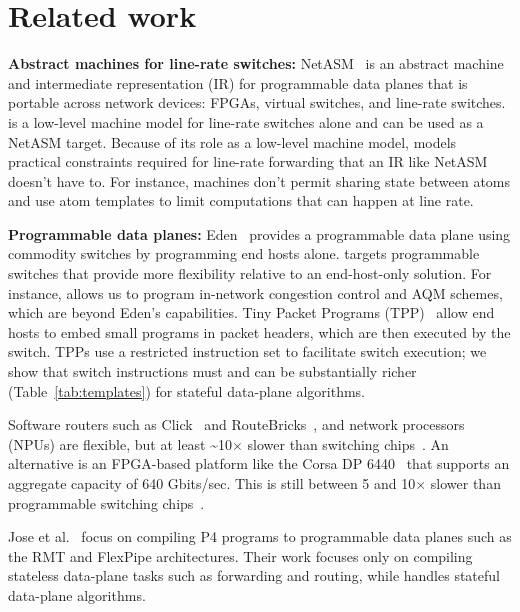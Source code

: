 \section{Related work}
\label{s:related}
\textbf{Abstract machines for line-rate switches:}
NetASM~\cite{netasm} is an abstract machine and intermediate representation
(IR) for programmable data planes that is portable across network
devices: FPGAs, virtual switches, and line-rate switches.  \absmachine is a
low-level machine model for line-rate switches alone and can be used as a
NetASM target. Because of its role as a low-level machine model, \absmachine
models practical constraints required for line-rate forwarding that an IR like
NetASM doesn't have to. For instance, \absmachine machines don't permit sharing
state between atoms and use atom templates to limit computations that can
happen at line rate.


\textbf{Programmable data planes:}
Eden~\cite{eden} provides a programmable data plane using commodity switches by
programming end hosts alone. \pktlanguage targets programmable switches that
provide more flexibility relative to an end-host-only solution. For instance,
\pktlanguage allows us to program in-network congestion control and AQM
schemes, which are beyond Eden's capabilities.  Tiny Packet Programs
(TPP)~\cite{tpp} allow end hosts to embed small programs in packet headers,
which are then executed by the switch. TPPs use a restricted instruction set to
facilitate switch execution; we show that switch instructions must and can be
substantially richer (Table~\ref{tab:templates}) for stateful data-plane
algorithms.

Software routers such as Click~\cite{click} and RouteBricks~\cite{routebricks},
and network processors~\cite{ixp4xx} (NPUs) are flexible, but at least
\textasciitilde10$\times$ slower than switching chips~\cite{rmt}.  An
alternative is an FPGA-based platform like the Corsa DP 6440~\cite{corsa} that
supports an aggregate capacity of 640 Gbits/sec. This is still between 5 and
10$\times$ slower than programmable switching chips~\cite{xpliant, tofino}.

Jose et al.~\cite{lavanya_compiler} focus on compiling P4 programs to
programmable data planes such as the RMT and FlexPipe architectures. Their work
focuses only on compiling stateless data-plane tasks such as forwarding and
routing, while \pktlanguage handles stateful data-plane algorithms.


